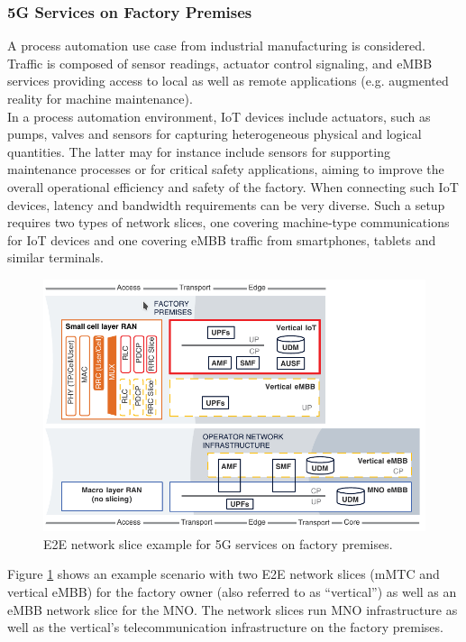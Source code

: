 \documentclass[a4paper,12pt]{report} %
\begin{document}
\subsubsection{5G Services on Factory Premises}
A process automation use case from industrial manufacturing is considered. Traffic is composed of sensor readings, actuator control signaling, and eMBB services providing access to local as well as remote applications (e.g. augmented reality for machine maintenance).\\
In a process automation environment, \gls{IoT} devices include actuators, such as pumps, valves and
sensors for capturing heterogeneous physical and logical quantities. The latter may for instance include sensors for supporting maintenance processes or for critical safety
applications, aiming to improve the overall operational efficiency and safety of the factory. When
connecting such IoT devices, latency and bandwidth requirements can be very diverse. Such a setup
requires two types of network slices, one covering machine‐type communications for IoT devices
and one covering eMBB traffic from smartphones, tablets and similar terminals. 
\begin{figure}
\centering
\includegraphics[scale=0.56]{pics/example.png}
\caption{E2E network slice example for 5G services on factory premises. \cite{al20185g}}
\label{exem} 
\end{figure}
Figure \ref{exem} shows an example scenario with two E2E network slices (mMTC and vertical eMBB) for the factory owner (also
referred to as “vertical”) as well as an eMBB network slice for the MNO. The network slices run MNO infrastructure as well as the vertical’s telecommunication infrastructure on the factory premises.
\end{document}
